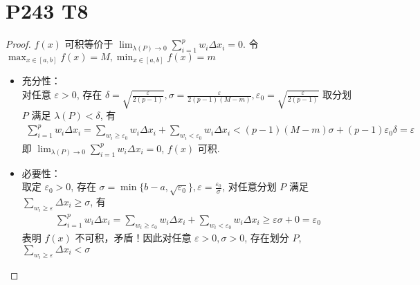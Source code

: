 \documentclass{article}
\begin{document}
\section*{P243 T8}

\begin{proof}
    $f(x)$ 可积等价于 $\lim_{\lambda(P) \to 0}\sum_{i = 1}^{p}w_i\Delta x_i = 0$. 令 $\max_{x \in [a, b]} f(x) = M, \min_{x \in [a, b]} f(x) = m$ \\
    \begin{itemize}
        \item 充分性： \\
        对任意 $\varepsilon > 0$, 存在 $\delta = \sqrt{\frac{\varepsilon}{2(p - 1)}}, \sigma = \frac{\varepsilon}{2(p - 1)(M - m)}, \varepsilon_0 = \sqrt{\frac{\varepsilon}{2(p - 1)}}$ 取分划 $P$ 满足 $\lambda(P) < \delta$, 有
        \begin{align*}
            \sum_{i = 1}^{p}w_i\Delta x_i = \sum_{w_i \geqslant \varepsilon_0}w_i\Delta x_i + \sum_{w_i < \varepsilon_0}w_i\Delta x_i < (p - 1)(M - m)\sigma + (p - 1)\varepsilon_0\delta = \varepsilon
        \end{align*}
        即 $\lim_{\lambda(P) \to 0}\sum_{i = 1}^{p}w_i\Delta x_i = 0$, $f(x)$ 可积.
        \item 必要性：\\
        取定 $\varepsilon_0 > 0$, 存在 $\sigma = \min \{b - a, \sqrt{\varepsilon_0}\}, \varepsilon = \frac{\varepsilon_0}{\sigma}$, 对任意分划 $P$ 满足 $\sum_{w_i \geqslant \varepsilon}\Delta x_i \geqslant \sigma$, 有
        \begin{align*}
            \sum_{i = 1}^{p}w_i\Delta x_i = \sum_{w_i \geqslant \varepsilon_0}w_i\Delta x_i + \sum_{w_i < \varepsilon_0}w_i\Delta x_i \geqslant \varepsilon \sigma + 0 = \varepsilon_0
        \end{align*}
        表明 $f(x)$ 不可积，矛盾！因此对任意 $\varepsilon > 0, \sigma > 0$, 存在划分 $P$, $\sum_{w_i \geqslant \varepsilon}\Delta x_i < \sigma$
    \end{itemize}
\end{proof}
\end{document}
